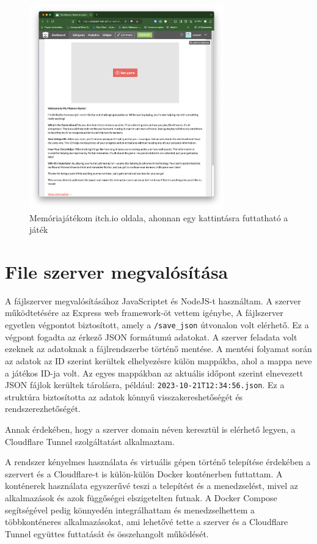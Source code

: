 \begin{figure}[h]
  \centering
  \includegraphics[width=0.75\textwidth]{img/Itch.io.png}
  \caption{Memóriajátékom itch.io oldala, ahonnan egy kattintásra futtatható a játék}
  \label{img:itch.io}  
\end{figure}


\section{File szerver megvalósítása}
A fájlszerver megvalósításához JavaScriptet és NodeJS-t használtam.
A szerver működtetésére az Express web framework-öt vettem igénybe, 
A fájlszerver egyetlen végpontot biztosított, amely a \lstinline{/save_json} útvonalon volt elérhető. 
Ez a végpont fogadta az érkező JSON formátumú adatokat. A szerver feladata volt ezeknek az adatoknak a fájlrendszerbe történő mentése. 
A mentési folyamat során az adatok az ID szerint kerültek elhelyezésre külön mappákba, ahol a mappa neve a játékos ID-ja volt. 
Az egyes mappákban az aktuális időpont szerint elnevezett JSON fájlok kerültek tárolásra, például: \texttt{2023-10-21T12:34:56.json}. 
Ez a struktúra biztosította az adatok könnyű visszakereshetőségét és rendszerezhetőségét.

Annak érdekében, hogy a szerver domain néven keresztül is elérhető legyen, a Cloudflare Tunnel szolgáltatást alkalmaztam. 

A rendszer kényelmes használata és virtuális gépen történő telepítése érdekében a szervert és a Cloudflare-t is külön-külön Docker konténerben futtattam.
A konténerek használata egyszerűvé teszi a telepítést és a menedzselést, mivel az alkalmazások és azok függőségei elszigetelten futnak. 
A Docker Compose segítségével pedig könnyedén integrálhattam és menedzselhettem a többkonténeres alkalmazásokat, ami lehetővé tette a szerver és a Cloudflare Tunnel együttes futtatását és összehangolt működését.

